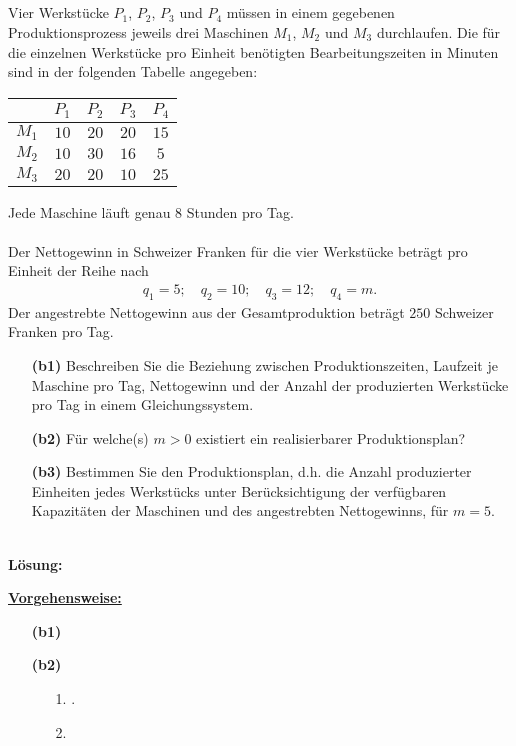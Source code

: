 \subsection*{}
Vier Werkstücke $P_1$, $P_2$, $P_3$ und $P_4$ müssen in einem gegebenen Produktionsprozess jeweils drei Maschinen $M_1$, $M_2$ und $M_3$ durchlaufen.
Die für die einzelnen Werkstücke pro Einheit benötigten Bearbeitungszeiten in Minuten sind in der folgenden Tabelle angegeben: 
\begin{table}[H]
	\centering
	\begin{tabular}{c | c c c c}
		$ $  & $P_1$  &  $P_2$ &  $P_3$ & $P_4$ \\ 
		\hline
		$ M_1 $ & $ 10 $ & $ 20 $ & $ 20 $ & $15$  \\ 
		$ M_2 $ & $ 10 $ & $ 30 $ & $ 16 $ & $5$ \\
		$ M_3 $ & $ 20 $ & $ 20 $ & $ 10 $ & $25$
	\end{tabular}%
\end{table}
Jede Maschine läuft genau $8$ Stunden pro Tag.\\
\\
Der Nettogewinn in Schweizer Franken für die vier Werkstücke beträgt pro Einheit der Reihe nach
\begin{align*}
	q_1 = 5; \quad
	q_2=  10; \quad
	q_3=12; \quad 
	q_4=m.
\end{align*}
Der angestrebte Nettogewinn aus der Gesamtproduktion beträgt $250$ Schweizer Franken pro Tag.
\begin{enumerate}
	\item[\textbf{(b1)}]
	Beschreiben Sie die Beziehung zwischen Produktionszeiten, Laufzeit je Maschine pro Tag, Nettogewinn und der Anzahl der produzierten Werkstücke pro Tag in einem Gleichungssystem.
	
	\item[\textbf{(b2)}] 
	Für welche(s) $m > 0$ existiert ein realisierbarer Produktionsplan?
	\item[\textbf{(b3)}]
	Bestimmen Sie den Produktionsplan, d.h. die Anzahl produzierter Einheiten jedes Werkstücks unter Berücksichtigung der verfügbaren Kapazitäten der Maschinen und des angestrebten Nettogewinns, für $m = 5$.
\end{enumerate}
\ \\
\textbf{Lösung:}
\begin{mdframed}
\underline{\textbf{Vorgehensweise:}}
\renewcommand{\labelenumi}{\theenumi.}
\begin{enumerate}
\item[\textbf{(b1)}] 
\item[\textbf{(b2)}] 
\begin{enumerate}
	\item[1.] .
	\item[2.] 
\end{enumerate}
\end{enumerate}
\end{mdframed}


